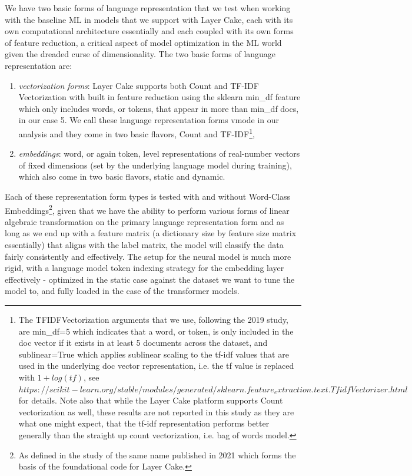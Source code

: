 \documentclass[final]{clv2025-revised}
\begin{document}
We have two basic forms of language representation that we test when working with the baseline ML in models that we support with Layer Cake, each with its own computational architecture essentially and each coupled with its own forms of feature reduction, a critical aspect of model optimization in the ML world given the dreaded curse of dimensionality.  The two basic forms of language representation are:

\begin{enumerate}
	\setlength\itemsep{2pt}
    \item \textit{vectorization forms}: Layer Cake supports both Count and TF-IDF Vectorization with built in feature reduction using the sklearn min\_df feature which only includes words, or tokens, that appear in more than min\_df docs, in our case 5. We call these language representation forms vmode in our analysis and they come in two basic flavors, Count and TF-IDF\footnote{The TFIDFVectorization arguments that we use, following the 2019 study, are min\_df=5 which indicates that a word, or token, is only included in the doc vector if it exists in at least 5 documents across the dataset, and sublinear=True which applies sublinear scaling to the tf-idf values that are used in the underlying doc vector representation, i.e. the tf value is replaced with $1+log(tf)$, see $https://scikit-learn.org/stable/modules/generated/sklearn.feature_extraction.text.TfidfVectorizer.html$ for details. Note also that while the Layer Cake platform supports Count vectorization as well, these results are not reported in this study as they are what one might expect, that the tf-idf representation performs better generally than the straight up count vectorization, i.e. bag of words model.}, 
    \item \textit{embeddings}: word, or again token, level representations of real-number vectors of fixed dimensions (set by the underlying language model during training), which also come in two basic flavors, static and dynamic. 
\end{enumerate}

Each of these representation form types is tested with and without Word-Class Embeddings\footnote{As defined in the study of the same name published in 2021 \cite{moreo2021} which forms the basis of the foundational code for Layer Cake.}, given that we have the ability to perform various forms of linear algebraic transformation on the primary language representation form and as long as we end up with a feature matrix  (a  dictionary size by feature size matrix essentially) that aligns with the label matrix, the model will classify the data fairly consistently and effectively. The setup for the neural model is much more rigid, with a language model token indexing strategy for the embedding layer effectively - optimized in the static case against the dataset we want to tune the model to, and fully loaded in the case of the transformer models.   
\end{document}
